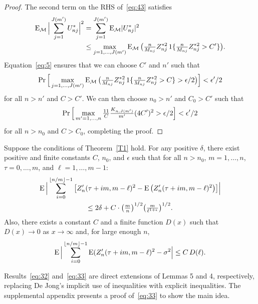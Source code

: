 \documentclass[11pt]{article}
\begin{document}
\begin{proof}
  The second term on the RHS of~\eqref{eq:43} satisfies
  \begin{align*}
    \operatorname{E}_{\mathcal{M}} \Big \lvert \sum_{j=1}^{J(m')} U_{nj}^* \Big \rvert^2
    & = \sum_{j=1}^{J(m')} \operatorname{E}_{\mathcal{M}} \lvert U_{nj}^* \rvert^2 \\
    & \leq \max_{j=1,\dots,J(m')} \operatorname{E}_{\mathcal{M}} \big(
      \tfrac{n}{M_{nj}} Z_{nj}^{*2}
      \operatorname{1}\{ \tfrac{n}{M_{nj}} Z_{nj}^{*2} > C' \} \big) .
  \end{align*}
  Equation~\eqref{eq:5} ensures that we can choose $C'$ and $n'$ such that
  \begin{equation*}
    \operatorname{Pr} \Big [
    \max_{j=1,\dots,J(m')} \operatorname{E}_{\mathcal{M}} \big(
      \tfrac{n}{M_{nj}} Z_{nj}^{*2}
      \operatorname{1}\{ \tfrac{n}{M_{nj}} Z_{nj}^{*2} > C \} > \epsilon / 2 \big) \Big ]
    < \epsilon' / 2
  \end{equation*}
  for all $n > n'$ and $C > C'$. We can then choose $n_0 > n'$ and $C_0 > C'$
  such that
  \begin{equation*}
    \operatorname{Pr} \Big [
    \max_{ m' = 1, \dots, n }
    \tfrac{11}{C} \tfrac{ K _{ n, J(m') } }{ m' } (4 C')^2
    > \epsilon / 2 \Big ] < \epsilon' / 2
  \end{equation*}
  for all $n > n_0$ and $C > C_0$,
  completing the proof.
\end{proof}

\begin{lem}\label{L7}
\newcommand{\isum}{\sum_{i=0}^{\lfloor n/m \rfloor - 1}}
  Suppose the conditions of Theorem~\ref{T1} hold.
  For any positive $\delta$, there exist positive and finite constants
  $C$, $n_0$, and $\epsilon$ such that
  for all $n > n_0$, $m = 1,\dots,n$, $\tau = 0,\dots,m$, and $\ell =
  1,\dots,m-1$:
\begin{multline}\label{eq:32}
    \E \Big\lvert \isum \big[Z_n'(\tau + i m, m - \ell)^2
    - \E \big(Z_n'(\tau + i m, m - \ell)^2\big) \big]\Big\rvert \\
    \leq 2 \delta + C \cdot \big(\tfrac{m}{n}\big)^{1/2}
    \big(\tfrac{m}{\ell^{1+\epsilon}}\big)^{1/2}.
\end{multline}
Also, there exists a constant $C$ and a finite function $D(x)$ such
that $D(x) \to 0$ as $x \to \infty$ and, for large enough $n$,
  \begin{equation}
    \label{eq:33}
    \E \Big\lvert \isum \E(Z_n'(\tau + i m, m - \ell)^2
    - \sigma^2 \Big\rvert \leq C\, D(\ell).
  \end{equation}
\end{lem}

Results~\eqref{eq:32} and~\eqref{eq:33} are direct extensions of
 Lemmas 5 and 4, respectively, replacing De Jong's
implicit use of inequalities with explicit inequalities. The
supplemental appendix presents a proof of~\eqref{eq:33} to show the
main idea.
\end{document}
